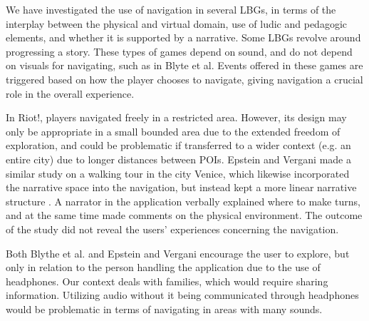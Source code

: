We have investigated the use of navigation in several LBGs, in terms of the interplay between the physical and virtual domain, use of ludic and pedagogic elements, and whether it is supported by a narrative. Some LBGs revolve around progressing a story. These types of games depend on sound, and do not depend on visuals for navigating, such as in Blyte et al. Events offered in these games are triggered based on how the player chooses to navigate, giving navigation a crucial role in the overall experience\cite{InterdisciplinaryCriticism}.

In Riot!\cite{InterdisciplinaryCriticism}, players navigated freely in a restricted area. However, its design may only be appropriate in a small bounded area due to the extended freedom of exploration, and could be problematic if transferred to a wider context (e.g. an entire city) due to longer distances between POIs. Epstein and Vergani made a similar study on a walking tour in the city Venice, which likewise incorporated the narrative space into the navigation, but instead kept a more linear narrative structure \cite{MobileTechnologies}. A narrator in the application verbally explained where to make turns, and at the same time made comments on the physical environment. The outcome of the study did not reveal the users' experiences concerning the navigation.

Both Blythe et al. and Epstein and Vergani encourage the user to explore, but only in relation to the person handling the application due to the use of headphones. Our context deals with families, which would require sharing information. Utilizing audio without it being communicated through headphones would be problematic in terms of navigating in areas with many sounds. 

